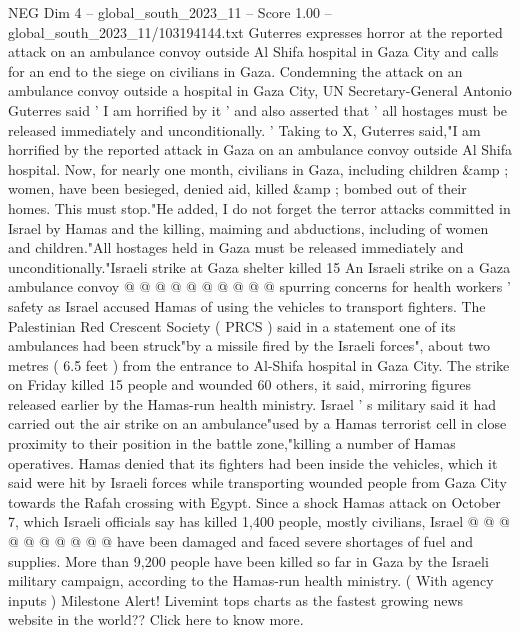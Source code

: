 \begin{textsample}{NEG Dim 4 – global\_south\_2023\_11 – Score 1.00 – global\_south\_2023\_11/103194144.txt}  \label{ex:f4_neg_298}
Guterres expresses horror at the reported attack on an ambulance convoy outside Al Shifa hospital in Gaza City and calls for an end to the siege on civilians in Gaza.
Condemning the attack on an ambulance convoy outside a hospital in Gaza City, UN Secretary-General Antonio Guterres said ' I am horrified by it ' and also asserted that ' all hostages must be released immediately and unconditionally. ' Taking to X, Guterres said,"I am horrified by the reported attack in Gaza on an ambulance convoy outside Al Shifa hospital.
Now, for nearly one month, civilians in Gaza, including children \&amp ; women, have been besieged, denied aid, killed \&amp ; bombed out of their homes.
This must stop."He added, I do not forget the terror attacks committed in Israel by Hamas and the killing, maiming and abductions, including of women and children."All hostages held in Gaza must be released immediately and unconditionally."Israeli strike at Gaza shelter killed 15 An Israeli strike on a Gaza ambulance convoy @ @ @ @ @ @ @ @ @ @ spurring concerns for health workers ' safety as Israel accused Hamas of using the vehicles to transport fighters.
The Palestinian Red Crescent Society ( PRCS ) said in a statement one of its ambulances had been struck"by a missile fired by the Israeli forces", about two metres ( 6.5 feet ) from the entrance to Al-Shifa hospital in Gaza City.
The strike on Friday killed 15 people and wounded 60 others, it said, mirroring figures released earlier by the Hamas-run health ministry.
Israel ' s military said it had carried out the air strike on an ambulance"used by a Hamas terrorist cell in close proximity to their position in the battle zone,"killing a number of Hamas operatives.
Hamas denied that its fighters had been inside the vehicles, which it said were hit by Israeli forces while transporting wounded people from Gaza City towards the Rafah crossing with Egypt.
Since a shock Hamas attack on October 7, which Israeli officials say has killed 1,400 people, mostly civilians, Israel @ @ @ @ @ @ @ @ @ @ have been damaged and faced severe shortages of fuel and supplies.
More than 9,200 people have been killed so far in Gaza by the Israeli military campaign, according to the Hamas-run health ministry. ( With agency inputs ) Milestone Alert!
Livemint tops charts as the fastest growing news website in the world??
Click here to know more.

\end{textsample}
